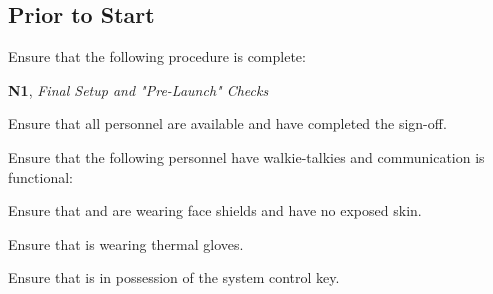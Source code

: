 \subsection{Prior to Start}
\begin{checklist}
    \item Ensure that the following procedure is complete:
    \begin{checklist}
        \item \textbf{N1}, \textit{Final Setup and "Pre-Launch" Checks}
    \end{checklist}
    \item Ensure that all personnel are available and have completed the sign-off.
    \item Ensure that the following personnel have walkie-talkies and communication is functional:
    \begin{checklist}
        \item \ops{}
        \item \control{}
        \item \primary{}
        \item \secondary{}
    \end{checklist}
    \item Ensure that \primary{} and \secondary{} are wearing face shields and have no exposed skin.
    \item Ensure that \primary{} is wearing thermal gloves.
    \item Ensure that \ops{} is in possession of the system control key.
\end{checklist}
\setcounter{checklistnum}{0}

